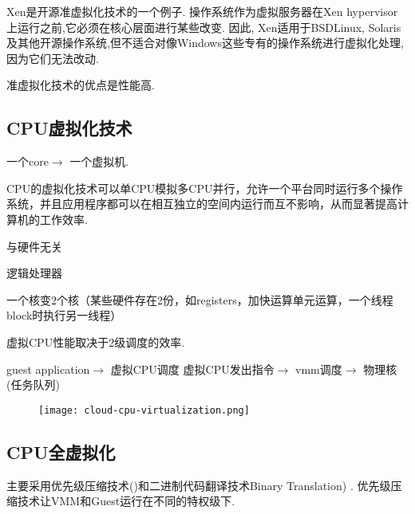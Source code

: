 Xen是开源准虚拟化技术的一个例子. 操作系统作为虚拟服务器在Xen hypervisor上运行之前,它必须在核心层面进行某些改变. 因此, Xen适用于BSDLinux, Solaris及其他开源操作系统,但不适合对像Windows这些专有的操作系统进行虚拟化处理,因为它们无法改动. 

准虚拟化技术的优点是性能高. 


\subsection{CPU虚拟化技术}


\begin{definition}[CPU虚拟化技术]
    一个core$\rightarrow$ 一个虚拟机.
\end{definition}

CPU的虚拟化技术可以单CPU模拟多CPU并行，允许一个平台同时运行多个操作系统，并且应用程序都可以在相互独立的空间内运行而互不影响，从而显著提高计算机的工作效率. 

\begin{definition}
    与硬件无关
\end{definition}

\begin{definition}
    逻辑处理器
\end{definition}

\begin{definition}[hyperthread]
    一个核变2个核（某些硬件存在2份，如registers，加快运算单元运算，一个线程block时执行另一线程）
\end{definition}

\begin{remark}
    虚拟CPU性能取决于2级调度的效率.

    guest application$\rightarrow$ 虚拟CPU调度
    虚拟CPU发出指令$\rightarrow$ vmm调度$\rightarrow$ 物理核(任务队列)

    \begin{figure}[htbp]
        \begin{center}
            \texttt{[image: cloud-cpu-virtualization.png]}
        \end{center}
    \end{figure}
\end{remark}



\subsection{CPU全虚拟化}
主要采用优先级压缩技术()和二进制代码翻译技术Binary Translation) . 优先级压缩技术让VMM和Guest运行在不同的特权级下. 

